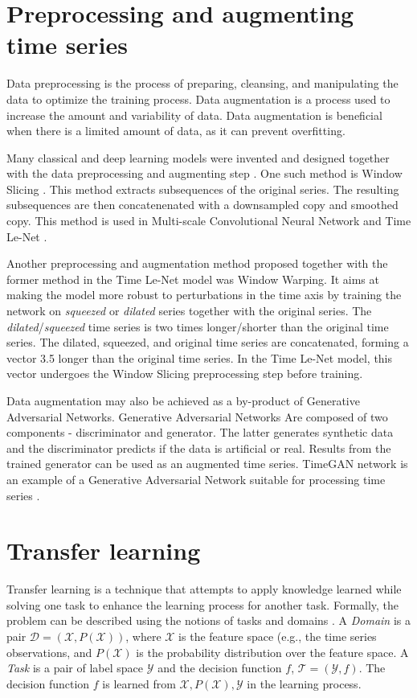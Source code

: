 \documentclass[a4paper,11pt,twoside]{report}
\theoremstyle{definition}
\begin{document}
\section{Preprocessing and augmenting time series}
Data preprocessing is the process of preparing, cleansing, and manipulating the data to optimize the training process. Data augmentation is a process used to increase the amount and variability of data. Data augmentation is beneficial when there is a limited amount of data, as it can prevent overfitting.

Many classical and deep learning models were invented and designed together with the data preprocessing and augmenting step \cite{bake_off, dl_tsc}. One such method is Window Slicing \cite{dl_tsc}. This method extracts subsequences of the original series. The resulting subsequences are then concatenenated with a downsampled copy and smoothed copy. This method is used in Multi-scale Convolutional Neural Network \cite{multiscale} and Time Le-Net \cite{timelenet}.

Another preprocessing and augmentation method proposed together with the former method in the Time Le-Net model was Window Warping. It aims at making the model more robust to perturbations in the time axis by training the network on \textit{squeezed} or \textit{dilated} series together with the original series. The \textit{dilated}/\textit{squeezed} time series is two times longer/shorter than the original time series.
The dilated, squeezed, and original time series are concatenated, forming a vector 3.5 longer than the original time series. In the Time Le-Net model, this vector undergoes the Window Slicing preprocessing step before training.

Data augmentation may also be achieved as a by-product of Generative Adversarial Networks. Generative Adversarial Networks Are composed of two components - discriminator and generator. The latter generates synthetic data and the discriminator predicts if the data is artificial or real. Results from the trained generator can be used as an augmented time series. TimeGAN network is an example of a Generative Adversarial Network suitable for processing time series \cite{timegan}.

\section{Transfer learning}
Transfer learning is a technique that attempts to apply knowledge learned  while solving one task to enhance the learning process for another task. Formally, the problem can be described using the notions of tasks and domains \cite{survey_transfer_learning, comp_survey_transfer_leaerning}. A \textit{Domain} is a pair $\mathcal{D}=(\mathcal{X}, P(\mathcal{X}))$, where $\mathcal{X}$ is the feature space (e.g., the time series observations, and $P(\mathcal{X})$ is the probability distribution over the feature space. A \textit{Task} is a pair of label space $\mathcal{Y}$ and the decision function $f$, $\mathcal{T} = (\mathcal{Y}, f)$. The decision function $f$ is learned from $\mathcal{X}, P(\mathcal{X}), \mathcal{Y}$ in the learning process.
\end{document}

